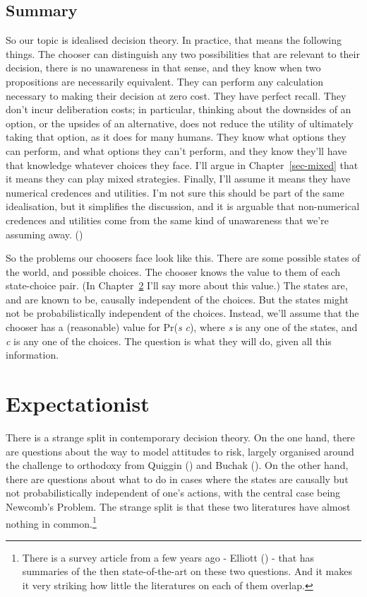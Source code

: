 \documentclass[
  12pt,
  letterpaper,
  DIV=11,
  numbers=noendperiod]{scrreprt}
\begin{document}
\section{Summary}\label{sec-ideal-summary}

So our topic is idealised decision theory. In practice, that means the
following things. The chooser can distinguish any two possibilities that
are relevant to their decision, there is no unawareness in that sense,
and they know when two propositions are necessarily equivalent. They can
perform any calculation necessary to making their decision at zero cost.
They have perfect recall. They don't incur deliberation costs; in
particular, thinking about the downsides of an option, or the upsides of
an alternative, does not reduce the utility of ultimately taking that
option, as it does for many humans. They know what options they can
perform, and what options they can't perform, and they know they'll have
that knowledge whatever choices they face. I'll argue in
Chapter~\ref{sec-mixed} that it means they can play mixed strategies.
Finally, I'll assume it means they have numerical credences and
utilities. I'm not sure this should be part of the same idealisation,
but it simplifies the discussion, and it is arguable that non-numerical
credences and utilities come from the same kind of unawareness that
we're assuming away. ()

So the problems our choosers face look like this. There are some
possible states of the world, and possible choices. The chooser knows
the value to them of each state-choice pair. (In
Chapter~\ref{sec-expect} I'll say more about this value.) The states
are, and are known to be, causally independent of the choices. But the
states might not be probabilistically independent of the choices.
Instead, we'll assume that the chooser has a (reasonable) value for
Pr(\emph{s} \textbar{} \emph{c}), where \emph{s} is any one of the
states, and \emph{c} is any one of the choices. The question is what
they will do, given all this information.


\chapter{Expectationist}\label{sec-expect}

There is a strange split in contemporary decision theory. On the one
hand, there are questions about the way to model attitudes to risk,
largely organised around the challenge to orthodoxy from Quiggin
() and Buchak
(). On the other hand, there are
questions about what to do in cases where the states are causally but
not probabilistically independent of one's actions, with the central
case being Newcomb's Problem. The strange split is that these two
literatures have almost nothing in common.\footnote{There is a survey
  article from a few years ago - Elliott
  () - that has summaries of the then
  state-of-the-art on these two questions. And it makes it very striking
  how little the literatures on each of them overlap.}
\end{document}
